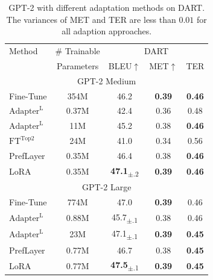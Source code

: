 \documentclass{article} %
\begin{document}
\begin{table}[h]
\centering
\begin{tabular}{lc|ccc}
\hline
\toprule
Method & \# Trainable &  \multicolumn{3}{c}{DART} \\ %
       & Parameters & BLEU$\uparrow$ & MET$\uparrow$ & TER  \\
\midrule
 \multicolumn{5}{c}{GPT-2 Medium}\\
Fine-Tune & 354M & 46.2 & \textbf{0.39} & \textbf{0.46}  \\
$\text{Adapter}^{\text{L}}$ & 0.37M & 42.4 & 0.36 & 0.48 \\
$\text{Adapter}^{\text{L}}$ & 11M & 45.2 & 0.38 & \textbf{0.46} \\
$\text{FT}^{\text{Top2}}$ & 24M & 41.0 & 0.34 & 0.56 \\
PrefLayer & 0.35M & 46.4 & 0.38 & \textbf{0.46}   \\
LoRA  & 0.35M & \textbf{47.1}\textsubscript{$\pm$.2}  & \textbf{0.39} & \textbf{0.46} \\
\midrule
 \multicolumn{5}{c}{GPT-2 Large}\\
Fine-Tune & 774M & 47.0 & \textbf{0.39} & 0.46  \\
$\text{Adapter}^{\text{L}}$ & 0.88M & 45.7\textsubscript{$\pm$.1} & 0.38 & 0.46 \\
$\text{Adapter}^{\text{L}}$ & 23M & 47.1\textsubscript{$\pm$.1} & \textbf{0.39} & \textbf{0.45} \\
PrefLayer & 0.77M & 46.7 & 0.38 & \textbf{0.45} \\
LoRA & 0.77M & \textbf{47.5}\textsubscript{$\pm$.1} & \textbf{0.39} &  \textbf{0.45} \\
\bottomrule
\end{tabular}
\caption{GPT-2 with different adaptation methods on DART. The variances of MET and TER are less than $0.01$ for all adaption approaches. }
\label{tab:gpt2_ft_dart}
\end{table}
\end{document}
